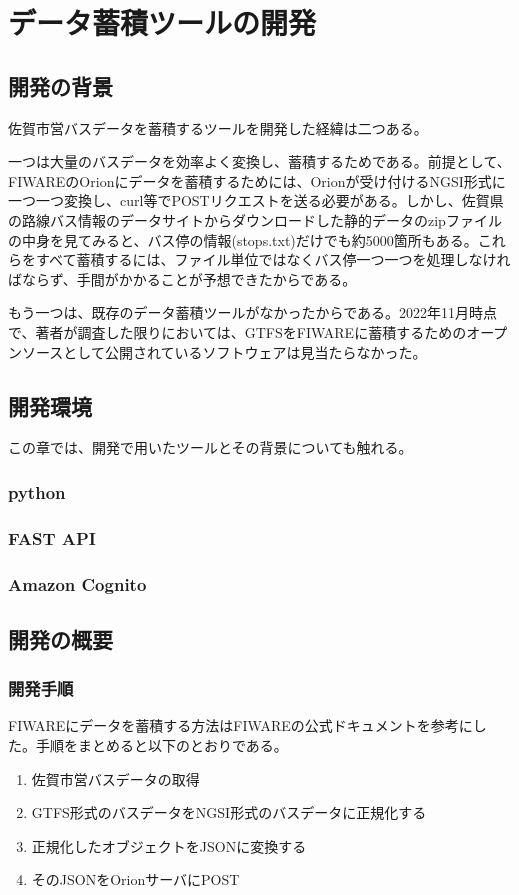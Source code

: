 \documentclass[a4paper, 12pt]{jsreport}
\begin{document}
  \chapter{データ蓄積ツールの開発}
  \section{開発の背景}
  \par 佐賀市営バスデータを蓄積するツールを開発した経緯は二つある。 \par 一つは大量のバスデータを効率よく変換し、蓄積するためである。前提として、FIWAREのOrionにデータを蓄積するためには、Orionが受け付けるNGSI形式に一つ一つ変換し、curl等でPOSTリクエストを送る必要がある。しかし、佐賀県の路線バス情報のデータサイトからダウンロードした静的データのzipファイルの中身を見てみると、バス停の情報(stops.txt)だけでも約5000箇所もある。これらをすべて蓄積するには、ファイル単位ではなくバス停一つ一つを処理しなければならず、手間がかかることが予想できたからである。
  \par もう一つは、既存のデータ蓄積ツールがなかったからである。2022年11月時点で、著者が調査した限りにおいては、GTFSをFIWAREに蓄積するためのオープンソースとして公開されているソフトウェアは見当たらなかった。
  \section{開発環境}
  この章では、開発で用いたツールとその背景についても触れる。
  \subsection{python}
  \par
  \subsection{FAST API}
  \par
  \subsection{Amazon Cognito}
  \par
  \section{開発の概要}


  \subsection{開発手順}
  FIWAREにデータを蓄積する方法はFIWAREの公式ドキュメントを参考にした。手順をまとめると以下のとおりである。
  \begin{enumerate}
    \item 佐賀市営バスデータの取得

    \item GTFS形式のバスデータをNGSI形式のバスデータに正規化する

    \item 正規化したオブジェクトをJSONに変換する

    \item そのJSONをOrionサーバにPOST
  \end{enumerate}
  \par
\end{document}
